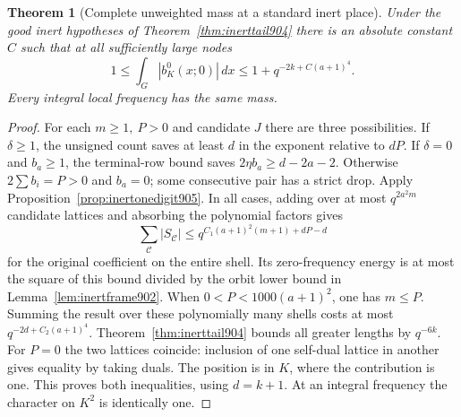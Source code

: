 \documentclass[a4paper,11pt]{article}
\newtheorem{theorem}[proposition]{Theorem}
\theoremstyle{definition}
\theoremstyle{remark}
\numberwithin{equation}{section}
\begin{document}
\begin{theorem}[Complete unweighted mass at a standard inert place]
\leavevmode\label{thm:inertzero905}
Under the good inert hypotheses of Theorem~\ref{thm:inerttail904}
there is an absolute constant \(C\) such that at all sufficiently
large nodes
\[
          1\le\int_G |b^0_K(x;0)|\,dx
               \le 1+q^{-2k+C(a+1)^4}.
\]
Every integral local frequency has the same mass.
\end{theorem}
\begin{proof}
For each \(m\ge1,\ P>0\) and candidate \(J\) there are three
possibilities. If \(\delta\ge1\), the unsigned count saves
at least \(d\) in the exponent relative to \(dP\).
If \(\delta=0\) and \(b_a\ge1\), the terminal-row bound saves
\(2\eta b_a\ge d-2a-2\). Otherwise \(2\sum b_i=P>0\) and
\(b_a=0\); some consecutive pair has a strict drop. Apply
Proposition~\ref{prop:inertonedigit905}. In all cases, adding
over at most \(q^{2a^2m}\) candidate lattices and absorbing the
polynomial factors gives
\[
       \sum_{\mathcal C}|S_{\mathcal C}|
               \le q^{C_1(a+1)^2(m+1)+dP-d}
\]
for the original coefficient on the entire shell. Its zero-frequency
energy is at most the square of this bound divided by the
orbit lower bound in Lemma~\ref{lem:inertframe902}.
When \(0<P<1000(a+1)^2\), one has \(m\le P\). Summing the
result over these polynomially many shells costs at most
\(q^{-2d+C_2(a+1)^4}\). Theorem~\ref{thm:inerttail904}
bounds all greater lengths by \(q^{-6k}\).
For \(P=0\) the two lattices coincide: inclusion of one
self-dual lattice in another gives equality by taking duals.
The position is in \(K\), where the contribution is one.
This proves both inequalities, using \(d=k+1\).
At an integral frequency the character on \(K^2\) is
identically one.
\end{proof}
\end{document}
